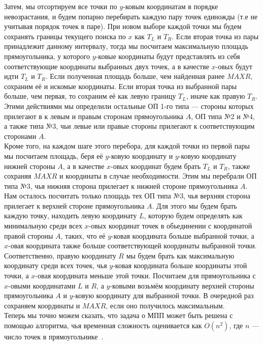 \documentclass[a4paper,12pt]{article}
\begin{document}
{Затем, мы отсортируем все точки по $y$-ковым координатам в порядке невозрастания, и будем попарно перебирать каждую пару точек единожды (т.е не учитывая порядок точек в паре). При новом выборе каждой точки мы будем сохранять границы текущего поиска
по $x$ как $T_L$ и $T_R$. Если вторая точка из пары принадлежит данному интервалу, тогда мы посчитаем максимальную площадь прямоугольника, у которого $y$-ковые координаты будут представлять из себя соответствующие координаты выбранных двух точек, а в качестве $x$-овых будут идти $T_L$ и $T_R$. Если полученная площадь больше, чем найденная ранее $MAXR$, сохраним её и искомые координаты. Если вторая точка из выбранной пары больше, чем первая, то сохраним её как левую границу $T_L$, иначе как правую $T_R$. Этими действиями мы определили остальные ОП 1-го типа — стороны которых прилегают в к левым и правым сторонам прямоугольника $A$, ОП типа №2 и №4, а также типа №3, чьи левые или правые стороны прилегают к соответствующим сторонами $A$.  \\
Кроме того, на каждом шаге этого перебора, для каждой точки из первой пары мы посчитаем площадь, беря её $y$-ковую координату и $y$-ковую координату нижней стороны $A$, а в качестве $x$-овых координат будем брать $T_L$ и $T_R$, также сохраняя $MAXR$ и координаты в случае необходимости. Этим мы перебрали ОП типа №3, чья нижняя сторона прилегает к нижней стороне прямоугольника $A$. \\
Нам осталось посчитать только площадь тех ОП типа №3, чья верхняя сторона прилегает к верхней стороне прямоугольника $A$. Для этого мы будем брать каждую точку, находить левую координату $L$, которую будем определять как минимальную среди всех $x$-овых координат точек в обьединении с координатой правой стороны $A$, таких, что её $y$-ковая координата больше выбранной точки, а $x$-овая координата также больше соответствующей координаты выбранной точки. Соответственно, правую координату $R$ мы будем брать как максимальную координату среди всех точек, чья $y$-ковая координата больше координаты этой точки, а $x$-овая координата меньше этой точки. Посчитаем для прямоугольника с $x$-овыми координатами $L$ и $R$, а $y$-ковыми возьмём координату верхней стороны прямоугольника $A$ и $y$-ковую координату для выбранной точки. В очередной раз сохраняем координаты и $MAXR$, если оно получилось максимальным. \\
Теперь мы точно можем сказать, что задача о МПП может быть решена с помощью алгоритма, чья временная сложность оценивается как $O(n^2)$, где $n$ — число точек в прямоугольнике~\cite{Nandy2}.\\
}
\end{document}
